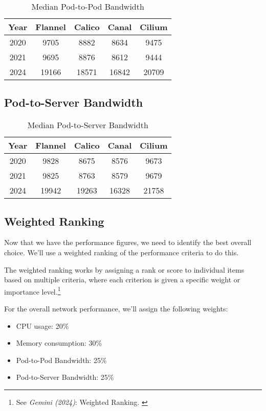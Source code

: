 \begin{table}[H]
\caption{Median Pod-to-Pod Bandwidth}
\begin{tabular}{|c | c | c | c | c|} 
 \hline
 Year & Flannel & Calico & Canal & Cilium \\
 \hline\hline
 2020 & 9705 & 8882 & 8634 & 9475 \\ 
 \hline
 2021 & 9695 & 8876 & 8612 & 9444 \\
 \hline
 2024 & 19166 & 18571 & 16842 & 20709 \\
 \hline
\end{tabular}
\label{tab:p2pbw}
\end{table}

\subsection{Pod-to-Server Bandwidth}

\begin{table}[H]
\caption{Median Pod-to-Server Bandwidth}
\begin{tabular}{|c | c | c | c | c|} 
 \hline
 Year & Flannel & Calico & Canal & Cilium \\
 \hline\hline
 2020 & 9828 & 8675 & 8576 & 9673 \\ 
 \hline
 2021 & 9825 & 8763 & 8579 & 9679 \\
 \hline
 2024 & 19942 & 19263 & 16328 & 21758 \\
 \hline
\end{tabular}
\label{tab:p2ebw}
\end{table}

\subsection{Weighted Ranking}

Now that we have the performance figures, we need to identify the best overall choice. We'll use a weighted ranking of the performance criteria to do this.

The weighted ranking works by assigning a rank or score to individual items based on multiple criteria, where each criterion is given a specific weight or importance level.\footnote{See \textit{Gemini (2024)}: Weighted Ranking. \cite{bardWeigthed}}

For the overall network performance, we'll assign the following weights:

\begin{itemize}
    \item CPU usage: 20\%
    \item Memory consumption: 30\%
    \item Pod-to-Pod Bandwidth: 25\%
    \item Pod-to-Server Bandwidth: 25\%
\end{itemize}

